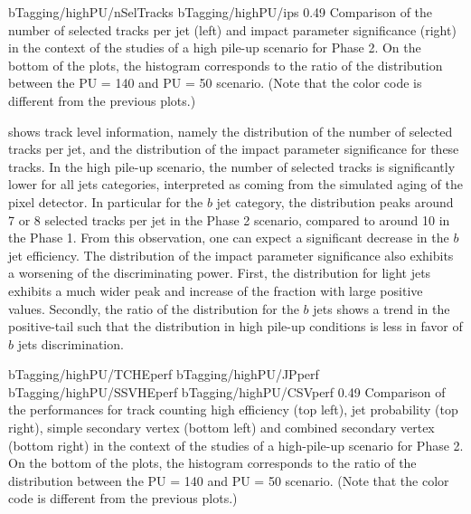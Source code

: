                      {bTagging/highPU/nSelTracks}
                     {bTagging/highPU/ips}
                     {0.49}
                     {Comparison of the number of selected tracks per jet (left) and
                     impact parameter significance (right) in the context of the
                     studies of a high pile-up scenario for Phase 2.
                     On the bottom of the plots, the histogram corresponds
                     to the ratio of the distribution between the PU = 140 and PU = 50
                     scenario.
                     (Note that the color code is different from the previous plots.)
                     }

     shows track level information, namely the
    distribution of the number of selected tracks per jet, and the distribution of the
    impact parameter significance for these tracks. In the high pile-up scenario, the
    number of selected tracks is significantly lower for all jets categories, interpreted
    as coming from the simulated aging of the pixel detector. In particular
    for the $b$ jet category, the distribution peaks around 7 or 8 selected tracks per
    jet in the Phase 2 scenario, compared to around 10 in the Phase 1. From this observation, one
    can expect a significant decrease in the $b$ jet efficiency. The distribution of
    the impact parameter significance also exhibits a worsening of the discriminating
    power. First, the distribution for light jets exhibits a much wider peak and
    increase of the fraction with large positive values. Secondly, the ratio of the
    distribution for the $b$ jets shows a trend in the positive-tail such that the
    distribution in high pile-up conditions is less in favor of $b$ jets discrimination.

                      {bTagging/highPU/TCHEperf}
                      {bTagging/highPU/JPperf}
                      {bTagging/highPU/SSVHEperf}
                      {bTagging/highPU/CSVperf}
                      {0.49}
                      {Comparison of the performances for track counting high efficiency
                      (top left), jet probability (top right), simple secondary vertex
                      (bottom left) and combined secondary vertex
                      (bottom right) in the context of the studies of a high-pile-up
                      scenario for Phase 2. On the bottom of the plots, the histogram corresponds
                      to the ratio of the distribution between the PU = 140 and PU = 50
                      scenario. (Note that the color code is different from the previous plots.) }

